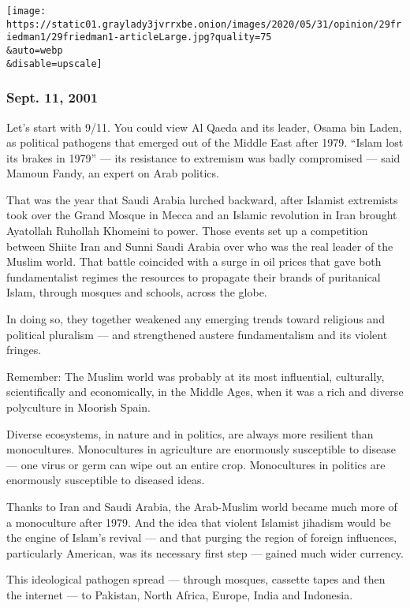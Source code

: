 \texttt{[image: https://static01.graylady3jvrrxbe.onion/images/2020/05/31/opinion/29friedman1/29friedman1-articleLarge.jpg?quality=75\\\&auto=webp\\\&disable=upscale]}

\hypertarget{sept-11-2001}{%
\subsubsection{Sept. 11, 2001}\label{sept-11-2001}}

Let's start with 9/11. You could view Al Qaeda and its leader, Osama bin
Laden, as political pathogens that emerged out of the Middle East after
1979. ``Islam lost its brakes in 1979'' --- its resistance to extremism
was badly compromised --- said Mamoun Fandy, an expert on Arab politics.

That was the year that Saudi Arabia lurched backward, after Islamist
extremists took over the Grand Mosque in Mecca and an Islamic revolution
in Iran brought Ayatollah Ruhollah Khomeini to power. Those events set
up a competition between Shiite Iran and Sunni Saudi Arabia over who was
the real leader of the Muslim world. That battle coincided with a surge
in oil prices that gave both fundamentalist regimes the resources to
propagate their brands of puritanical Islam, through mosques and
schools, across the globe.

In doing so, they together weakened any emerging trends toward religious
and political pluralism --- and strengthened austere fundamentalism and
its violent fringes.

Remember: The Muslim world was probably at its most influential,
culturally, scientifically and economically, in the Middle Ages, when it
was a rich and diverse polyculture in Moorish Spain.

Diverse ecosystems, in nature and in politics, are always more resilient
than monocultures. Monocultures in agriculture are enormously
susceptible to disease --- one virus or germ can wipe out an entire
crop. Monocultures in politics are enormously susceptible to diseased
ideas.

Thanks to Iran and Saudi Arabia, the Arab-Muslim world became much more
of a monoculture after 1979. And the idea that violent Islamist jihadism
would be the engine of Islam's revival --- and that purging the region
of foreign influences, particularly American, was its necessary first
step --- gained much wider currency.

This ideological pathogen spread --- through mosques, cassette tapes and
then the internet --- to Pakistan, North Africa, Europe, India and
Indonesia.

